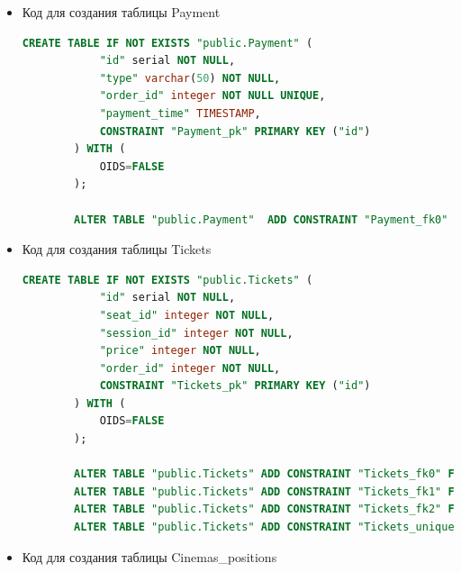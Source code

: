 \documentclass[a4paper,12pt]{article}
\renewcommand{\^}[2]{#1^{\, #2} \kern -1pt}
\newcommand{\1}{\kern 1pt}
\newcommand{\0}{\kern -1pt}
\begin{document}
\begin{itemize}
	\begin{lstlisting}[style=vscode-dark, language=SQL, label={lst:sql15}]
		CREATE TABLE IF NOT EXISTS "public.Orders" (
			"id" serial NOT NULL,
			"customer_id" integer NOT NULL,
			"isBooked" BOOLEAN DEFAULT(false),
			"total_price" integer NOT NULL DEFAULT 0,
			CONSTRAINT "Orders_pk" PRIMARY KEY ("id")
		) WITH (
			OIDS=FALSE
		);
		
		ALTER TABLE "public.Orders" ADD CONSTRAINT "Orders_fk0" FOREIGN KEY ("customer_id") REFERENCES "public.Customers"("id");
	\end{lstlisting}
	
	\item Код для создания таблицы Payment

	\begin{lstlisting}[style=vscode-dark, language=SQL, label={lst:sql16}]
		CREATE TABLE IF NOT EXISTS "public.Payment" (
			"id" serial NOT NULL,
			"type" varchar(50) NOT NULL,
			"order_id" integer NOT NULL UNIQUE,
			"payment_time" TIMESTAMP,
			CONSTRAINT "Payment_pk" PRIMARY KEY ("id")
		) WITH (
			OIDS=FALSE
		);
		
		ALTER TABLE "public.Payment"  ADD CONSTRAINT "Payment_fk0" FOREIGN KEY ("order_id") REFERENCES "public.Orders"("id");
	\end{lstlisting}

	\item Код для создания таблицы Tickets

	\begin{lstlisting}[style=vscode-dark, language=SQL, label={lst:sql17}]
		CREATE TABLE IF NOT EXISTS "public.Tickets" (
			"id" serial NOT NULL,
			"seat_id" integer NOT NULL,
			"session_id" integer NOT NULL,
			"price" integer NOT NULL,
			"order_id" integer NOT NULL,
			CONSTRAINT "Tickets_pk" PRIMARY KEY ("id")
		) WITH (
			OIDS=FALSE
		);
		
		ALTER TABLE "public.Tickets" ADD CONSTRAINT "Tickets_fk0" FOREIGN KEY ("seat_id") REFERENCES "public.Seats"("id");
		ALTER TABLE "public.Tickets" ADD CONSTRAINT "Tickets_fk1" FOREIGN KEY ("session_id") REFERENCES "public.Sessions"("id");
		ALTER TABLE "public.Tickets" ADD CONSTRAINT "Tickets_fk2" FOREIGN KEY ("order_id") REFERENCES "public.Orders"("id");
		ALTER TABLE "public.Tickets" ADD CONSTRAINT "Tickets_unique" UNIQUE("seat_id", "session_id");
	\end{lstlisting}
	\newpage

	\item Код для создания таблицы Cinemas\_positions


\end{itemize}
\end{document}
